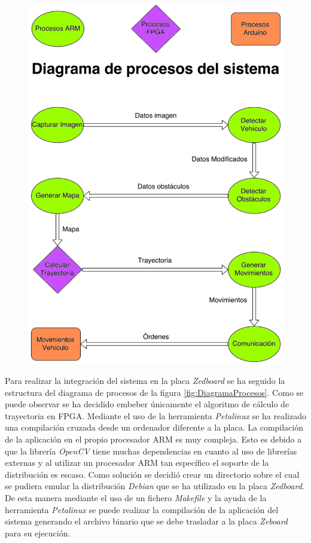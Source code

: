 \begin{figure}[hbtp]
\centering
	\includegraphics[width=1.11\textwidth]{./figures/DiagramaProcesos.pdf}
\end{figure}\label{fig:DiagramaProcesos}

Para realizar la integración del sistema en la placa \emph{Zedboard} se ha seguido la estructura del diagrama de procesos de la figura \ref{fig:DiagramaProcesos}. Como se puede observar se ha decidido embeber únicamente el algoritmo de cálculo de trayectoria en \ac{FPGA}. Mediante el uso de la herramienta \emph{Petalinux} se ha realizado una compilación cruzada desde un ordenador diferente a la placa. La compilación de la aplicación en el propio procesador \ac{ARM} es muy compleja. Esto es debido a que la librería \emph{OpenCV} tiene muchas dependencias en cuanto al uso de librerías externas y al utilizar un procesador \ac{ARM} tan específico el soporte de la distribución es escaso. Como solución se decidió crear un directorio sobre el cual se pudiera emular la distribución \emph{Debian} que se ha utilizado en la placa \emph{Zedboard}. De esta manera mediante el uso de un fichero \emph{Makefile} y la ayuda de la herramienta \emph{Petalinux} se puede realizar la compilación de la aplicación del sistema generando el archivo binario que se debe trasladar a la placa \emph{Zeboard} para su ejecución.

